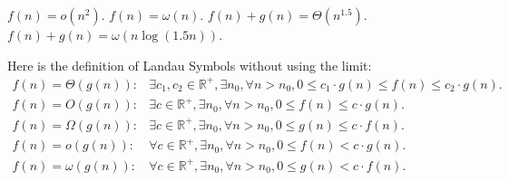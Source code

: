 \begin{parts}
	\begin{choices}
		\choice \( f(n) = o\left(n^2\right) \).
		\choice \( f(n) = \omega\left(n\right) \).
		\choice \( f(n)+g(n) = \Theta\left(n^{1.5}\right) \).
		\choice \( f(n)+g(n) = \omega\left(n\log{(1.5n)}\right) \).
	\end{choices}

Here is the definition of Landau Symbols without using the limit:
\begin{align*}
f(n)=\Theta(g(n)):& \exists c_1,c_2\in\mathbb{R}^+,\exists n_0,\forall n>n_0, 0\le c_1\cdot g(n)\le f(n)\le c_2\cdot g(n).\\
f(n)=O(g(n)):& \exists c\in\mathbb{R}^+,\exists n_0,\forall n>n_0, 0\le f(n)\le c\cdot g(n).\\
f(n)=\Omega(g(n)):& \exists c\in\mathbb{R}^+,\exists n_0,\forall n>n_0, 0\le g(n)\le c\cdot f(n).\\
f(n)=o(g(n)):& \forall c\in\mathbb{R}^+,\exists n_0,\forall n>n_0, 0\le f(n)<c\cdot g(n).\\
f(n)=\omega(g(n)):& \forall c\in\mathbb{R}^+,\exists n_0,\forall n>n_0, 0\le g(n)<c\cdot f(n).\\
\end{align*}

\end{parts}
